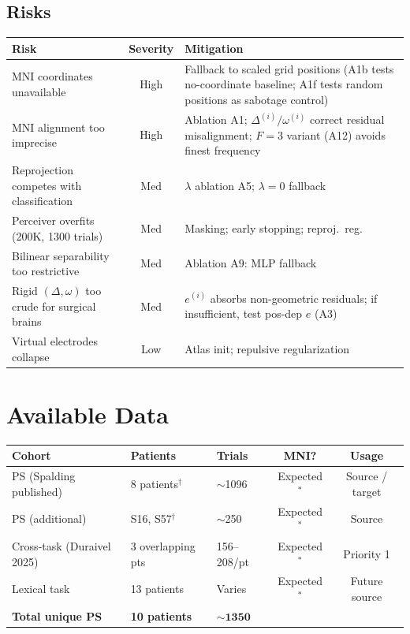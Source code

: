 \documentclass[11pt,letterpaper]{article}
\begin{document}
\subsection{Risks}

\begin{table}[ht!]\centering\small
\begin{tabular}{@{}p{}cp{}@{}}
\toprule
\textbf{Risk} & \textbf{Severity} & \textbf{Mitigation} \\
\midrule
MNI coordinates unavailable & High & Fallback to scaled grid positions (A1b tests no-coordinate baseline; A1f tests random positions as sabotage control) \\
MNI alignment too imprecise & High & Ablation A1; $\Delta^{(i)}/\omega^{(i)}$ correct residual misalignment; $F{=}3$ variant (A12) avoids finest frequency \\
Reprojection competes with classification & Med & $\lambda$ ablation A5; $\lambda{=}0$ fallback \\
Perceiver overfits (200K, 1300 trials) & Med & Masking; early stopping; reproj.\ reg. \\
Bilinear separability too restrictive & Med & Ablation A9: MLP fallback \\
Rigid $(\Delta,\omega)$ too crude for surgical brains & Med & $e^{(i)}$ absorbs non-geometric residuals; if insufficient, test pos-dep $e$ (A3) \\
Virtual electrodes collapse & Low & Atlas init; repulsive regularization \\
\bottomrule
\end{tabular}
\end{table}



\section{Available Data}\label{sec:data}

\begin{table}[ht!]\centering\small
\begin{tabular}{@{}lllcc@{}}
\toprule
\textbf{Cohort} & \textbf{Patients} & \textbf{Trials} & \textbf{MNI?} & \textbf{Usage} \\
\midrule
PS (Spalding published) & 8 patients$^\dagger$ & ${\sim}$1096 & Expected$^*$ & Source / target \\
PS (additional) & S16, S57$^\dagger$ & ${\sim}$250 & Expected$^*$ & Source \\
Cross-task (Duraivel 2025) & 3 overlapping pts & 156--208/pt & Expected$^*$ & Priority 1 \\
Lexical task & 13 patients & Varies & Expected$^*$ & Future source \\
\midrule
\textbf{Total unique PS} & \textbf{10 patients} & $\mathbf{{\sim}1350}$ & & \\
\bottomrule
\end{tabular}
\end{table}
\end{document}
